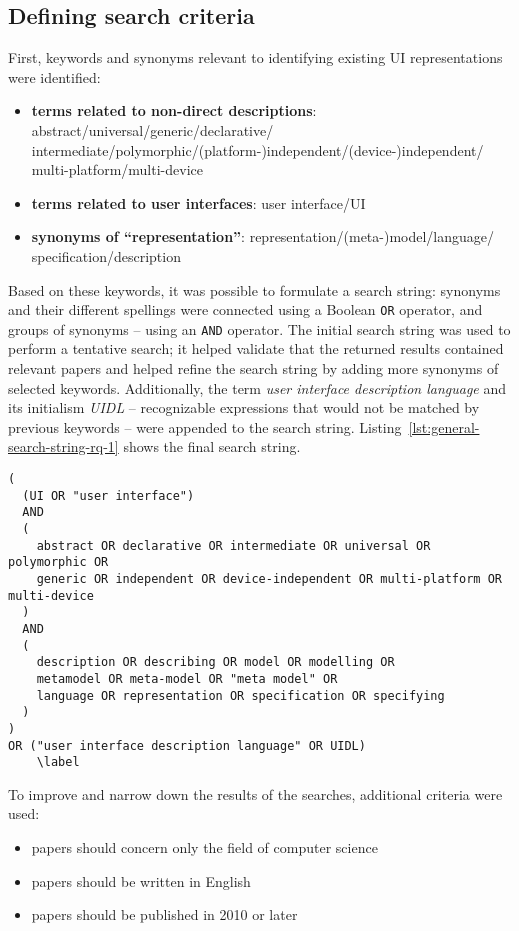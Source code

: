 \subsection{Defining search criteria}\label{subsec:defining-search-criteria}
First, keywords and synonyms relevant to identifying existing UI representations were identified:
\begin{itemize}
    \item \textbf{terms related to non-direct descriptions}: abstract/universal/generic/declarative/\\intermediate/polymorphic/(platform-)independent/(device-)independent/\\multi-platform/multi-device
    \item \textbf{terms related to user interfaces}: user interface/UI
    \item \textbf{synonyms of \enquote{representation}}: representation/(meta-)model/language/\\specification/description
\end{itemize}
Based on these keywords, it was possible to formulate a search string: synonyms and their different spellings were connected using a Boolean \texttt{OR} operator, and groups of synonyms -- using an \texttt{AND} operator.
The initial search string was used to perform a tentative search;
it helped validate that the returned results contained relevant papers and helped refine the search string by adding more synonyms of selected keywords.
Additionally, the term \emph{user interface description language} and its initialism \emph{UIDL} -- recognizable expressions that would not be matched by previous keywords -- were appended to the search string.
Listing~\ref{lst:general-search-string-rq-1} shows the final search string.
\begin{lstlisting}[label=lst:general-search-string-rq-1,caption=The search string, basicstyle=\ttfamily]
(
  (UI OR "user interface")
  AND
  (
    abstract OR declarative OR intermediate OR universal OR polymorphic OR
    generic OR independent OR device-independent OR multi-platform OR multi-device
  )
  AND
  (
    description OR describing OR model OR modelling OR
    metamodel OR meta-model OR "meta model" OR
    language OR representation OR specification OR specifying
  )
)
OR ("user interface description language" OR UIDL)
    \label
\end{lstlisting}

To improve and narrow down the results of the searches, additional criteria were used:
\begin{samepage}
\begin{itemize}
    \item papers should concern only the field of computer science
    \item papers should be written in English
    \item papers should be published in 2010 or later
\end{itemize}
\end{samepage}

